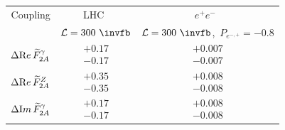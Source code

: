 \begin{table}[ht]
\begin{center}
\begin{footnotesize}
\begin{tabular}{|ccc|}
\hline 
 Coupling & LHC~\protect\cite{Juste:2006sv}  &
           $e^+e^-$~\protect\cite{AguilarSaavedra:2001rg}\\
 & $\mathcal{L}=300~\invfb$ & 
$\mathcal{L}=300~\invfb$,\, $P_{e^{-,+}} =-0.8$
\\
\hline
$\Delta {\mbox Re}\, \widetilde F_{2A}^{\gamma}$& $\begin{matrix} +0.17 \\[-4pt] -0.17\end{matrix}$ &$\begin{matrix} +0.007 \\[-4pt] -0.007\end{matrix}$   \\
$\Delta {\mbox Re}\, \widetilde F_{2A}^{Z}$& $\begin{matrix} +0.35 \\[-4pt] -0.35\end{matrix}$ &$\begin{matrix} +0.008 \\[-4pt] -0.008\end{matrix}$  \\
$\Delta {\mbox Im}\, \widetilde F_{2A}^{\gamma}$& $\begin{matrix} +0.17 \\[-4pt] -0.17\end{matrix}$  &$\begin{matrix} +0.008 \\[-4pt] -0.008\end{matrix}$  \\

\end{tabular}
\end{footnotesize}
\end{center}
\end{table}
